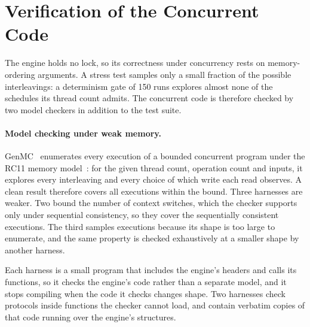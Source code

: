 \section{Verification of the Concurrent Code}
\label{sec:verification}

The engine holds no lock, so its correctness under concurrency rests on memory-ordering arguments.
A stress test samples only a small fraction of the possible interleavings: a determinism gate of
150 runs explores almost none of the schedules its thread count admits. The concurrent code is
therefore checked by two model checkers in addition to the test suite.

\paragraph{Model checking under weak memory.}
GenMC~\cite{kokologiannakis2021genmc} enumerates every execution of a bounded concurrent program
under the RC11 memory model~\cite{lahav2017repairing}: for the given thread count, operation count
and inputs, it explores every interleaving and every choice of which write each read observes. A
clean result therefore covers all executions within the bound. Three harnesses are weaker. Two
bound the number of context switches, which the checker supports only under sequential
consistency, so they cover the sequentially consistent executions. The third samples executions
because its shape is too large to enumerate, and the same property is checked exhaustively at a
smaller shape by another harness.

Each harness is a small program that includes the engine's headers and calls its functions, so it
checks the engine's code rather than a separate model, and it stops compiling when the code it
checks changes shape. Two harnesses check protocols inside functions the checker cannot load, and
contain verbatim copies of that code running over the engine's structures.

